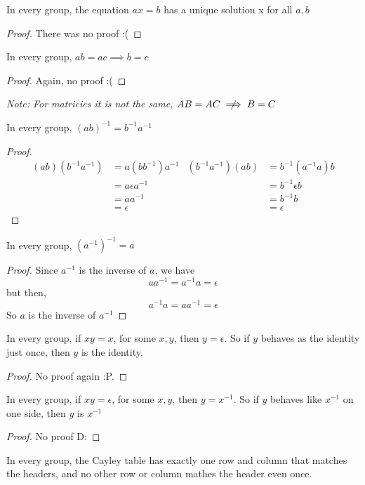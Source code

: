 \documentclass[openany]{report}
\begin{document}
\begin{prop}
    In every group, the equation $ax = b$ has a unique solution x for all $a,b$
\end{prop}
\begin{proof}
    There was no proof :(
\end{proof}
\begin{prop}
    In every group, $ab = ac \implies b = c$
\end{prop}
\begin{proof}
    Again, no proof :(
\end{proof}
\textit{Note: For matricies it is not the same, $AB = AC \centernot\implies B = C$}
\begin{prop}
    In every group, $(ab)^{-1} = b^{-1}a^{-1}$
\end{prop}
\begin{proof}
    \begin{align*}
        (ab)(b^{-1}a^{-1}) &= a(bb^{-1})a^{-1} & (b^{-1}a^{-1})(ab) &= b^{-1}(a^{-1}a)b\\
        &= a \epsilon a^{-1} & &= b^{-1} \epsilon b\\
        &= a a^{-1} & &=b^{-1} b\\
        &= \epsilon & &=\epsilon
    \end{align*}
\end{proof}
\begin{prop}
    In every group, $(a^{-1})^{-1} = a$
\end{prop}
\begin{proof}
    Since $a^{-1}$ is the inverse of $a$, we have
    $$aa^{-1} = a^{-1}a = \epsilon$$
    but then,
    $$a^{-1}a = aa^{-1} = \epsilon$$
    So $a$ is the inverse of $a^{-1}$
\end{proof}
\begin{prop}
    In every group, if $xy = x$, for some $x,y$, then $y = \epsilon$. So if $y$ behaves as the identity just once, then $y$ is the identity.
\end{prop}
\begin{proof}
    No proof again :P.
\end{proof}
\begin{prop}
    In every group, if $xy = \epsilon$, for some $x,y$, then $y = x^{-1}$. So if $y$ behaves like $x^{-1}$ on one side, then $y$ is $x^{-1}$
\end{prop}
\begin{proof}
    No proof D: 
\end{proof}
\begin{prop}
    In every group, the Cayley table has exactly one row and column that matches the headers, and no other row or column mathes the header even once.
\end{prop}
\end{document}
